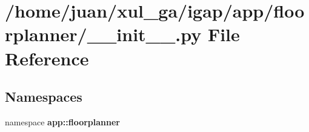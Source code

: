 \section{/home/juan/xul\_\-ga/igap/app/floorplanner/\_\-\_\-init\_\-\_\-.py File Reference}
\label{app_2floorplanner_2____init_____8py}
\subsection*{Namespaces}
\begin{CompactItemize}
\item 
namespace {\bf app::floorplanner}
\end{CompactItemize}
